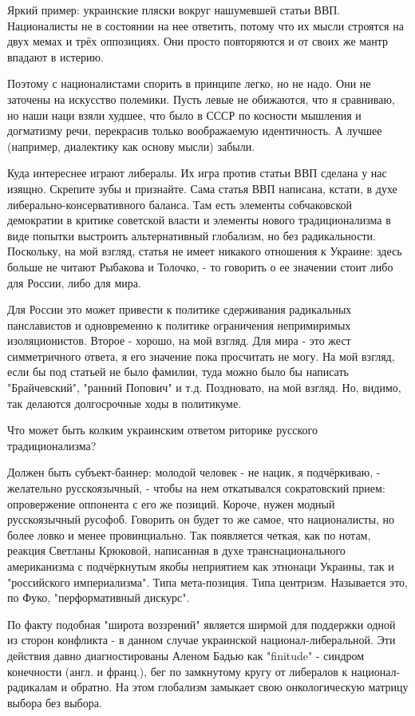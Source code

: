 Яркий пример: украинские пляски вокруг нашумевшей статьи ВВП. Националисты не в
состоянии на нее ответить, потому что их мысли строятся на двух мемах и трёх
оппозициях. Они просто повторяются и от своих же мантр впадают в истерию.

Поэтому с националистами спорить в принципе легко, но не надо. Они не заточены
на искусство полемики. Пусть левые не обижаются, что я сравниваю, но наши наци
взяли худшее, что было в СССР по косности мышления и догматизму речи,
перекрасив только воображаемую  идентичность. А лучшее (например, диалектику
как основу мысли) забыли.

Куда интереснее играют либералы. Их игра против статьи ВВП сделана у нас
изящно. Скрепите зубы и признайте. Сама статья ВВП написана, кстати, в духе
либерально-консервативного баланса. Там есть элементы собчаковской демократии в
критике советской власти и элементы нового традиционализма в виде попытки
выстроить альтернативный глобализм, но без радикальности. Поскольку, на мой
взгляд, статья не имеет никакого отношения к Украине: здесь больше не читают
Рыбакова и Толочко, - то говорить о ее значении стоит либо для России, либо для
мира. 

Для России это может привести к политике сдерживания радикальных панславистов и
одновременно к политике ограничения непримиримых изоляционистов. Второе -
хорошо, на мой взгляд. Для мира - это жест симметричного ответа, я его значение
пока просчитать не могу. На мой взгляд, если бы под статьей не было фамилии,
туда можно было бы написать "Брайчевский", "ранний Попович" и т.д. Поздновато,
на мой взгляд. Но, видимо, так делаются долгосрочные ходы в политикуме.

Что может быть колким украинским ответом риторике русского традиционализма?

Должен быть субъект-баннер: молодой человек - не нацик, я подчёркиваю, -
желательно русскоязычный, - чтобы на нем откатывался сократовский прием:
опровержение оппонента с его же позиций. Короче, нужен модный русскоязычный
русофоб. Говорить он будет то же самое, что националисты, но более ловко и
менее провинциально. Так появляется четкая, как по нотам, реакция Светланы
Крюковой, написанная в духе транснационального американизма с подчёркнутым
якобы неприятием как этнонаци Украины, так и "российского империализма". Типа
мета-позиция. Типа центризм. Называется это, по Фуко, "перформативный дискурс".

По факту подобная "широта воззрений" является ширмой для поддержки одной из
сторон конфликта - в данном случае украинской национал-либеральной. Эти
действия давно диагностированы Аленом Бадью как "finitude" - синдром конечности
(англ.  и франц.), бег по замкнутому кругу от либералов к национал-радикалам и
обратно. На этом глобализм замыкает свою онкологическую матрицу выбора без
выбора.

